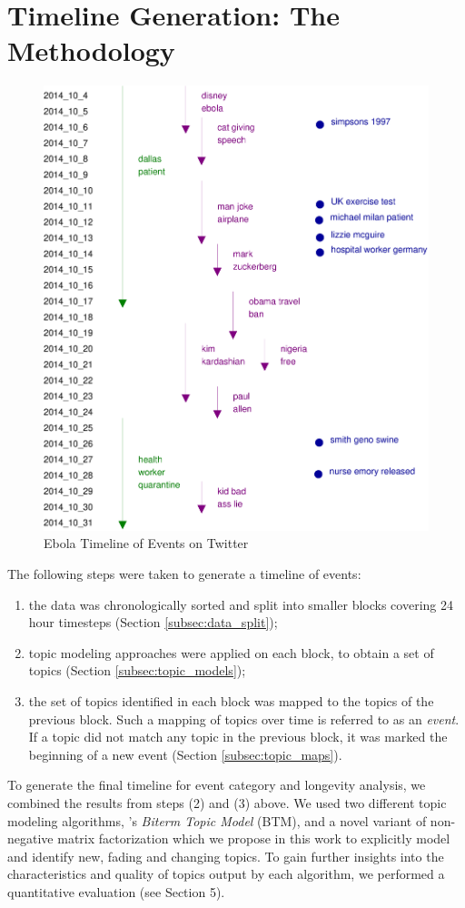 \section{Timeline Generation: The Methodology}
\label{sec:timeline_generation}
\begin{figure}
\includegraphics[width=\textwidth]{ICWSM/figures/timeline.eps}
\caption[Ebola: Timeline of events]{Ebola Timeline of Events on Twitter}
\label{fig:timeline}
\end{figure}
The following steps were taken to generate a timeline of events:
\begin{enumerate}
\item the data was chronologically sorted and split into smaller blocks covering 24 hour timesteps (Section \ref{subsec:data_split});
\item topic modeling approaches were applied on each block, to obtain a set of topics (Section \ref{subsec:topic_models});
\item the set of topics identified in each block was mapped to the topics of the previous block. Such a mapping of topics over time is
referred to as an \emph{event}.  If a topic did not match any topic in the previous block, it was marked the beginning of a new event (Section \ref{subsec:topic_maps}).
\end{enumerate}
To generate the final timeline for event category and longevity analysis, 
we combined the results from steps (2) and (3) above.
We used two different topic modeling algorithms, \cite{Yan:2013:BTM}'s \emph{Biterm Topic Model} (BTM), and a novel variant
of non-negative matrix factorization which we propose in this work to explicitly model and identify
new, fading and changing topics.  To gain further insights into the characteristics and quality of topics output by each algorithm, we performed a quantitative evaluation (see Section 5).  

